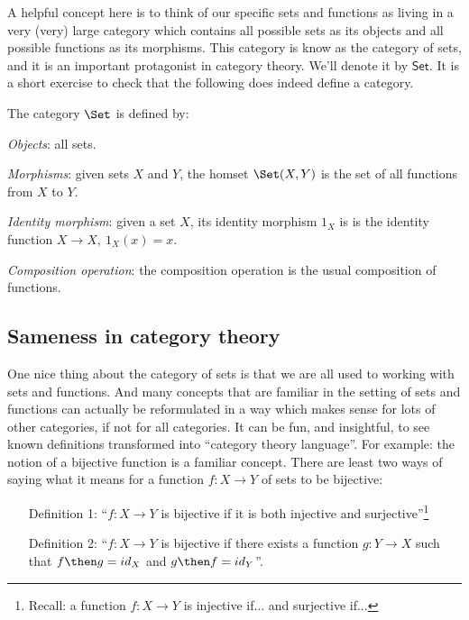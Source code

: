 A helpful concept here is to think of our specific sets and functions as living in a very (very) large category which contains all possible sets as its objects and all possible functions as its morphisms. This category is know as the category of sets, and it is an important protagonist in category theory. We'll denote it by $\mathsf{Set}$. It is a short exercise to check that the following does indeed define a category. 

\begin{shaded}
\begin{definition}
    The category $\Set$ is defined by:
    \begin{compactenum}
    \item \emph{Objects}: all sets.
    \item \emph{Morphisms}: given sets $X$ and  $Y$, the homset $\Set(X,Y)$ is the set of all functions from $X$ to $Y$.
    \item \emph{Identity morphism}: given a set $X$, its identity morphism $\text{1}_X$ is
    is the identity function $X \rightarrow X, \ \text{1}_X(x) = x$.
    \item \emph{Composition operation}: the composition operation is the usual composition of functions.
    \end{compactenum}
\end{definition}
\end{shaded}


\subsection{Sameness in category theory}

One nice thing about the category of sets is that we are all used to working with sets and functions. And many concepts that are familiar in the setting of sets and functions can actually be reformulated in a way which makes sense for lots of other categories, if not for all categories. It can be fun, and insightful, to see known definitions transformed into ``category theory language''. For example: the notion of a bijective function is a familiar concept. There are least two ways of saying what it means for a function $f : X \rightarrow Y$ of sets to be bijective:
\begin{itemize}
\item[Definition 1:] ``$f:X \rightarrow Y$ is bijective if it is both injective and surjective''\footnote{Recall: a function $f:X \rightarrow Y$ is injective if... and surjective if... }
\item[Definition 2:] ``$f: X \rightarrow Y$ is bijective if there exists a function $g: Y \rightarrow X$ such that $f \then g = id_X$ and $g \then f = id_Y$''. 
\end{itemize}

